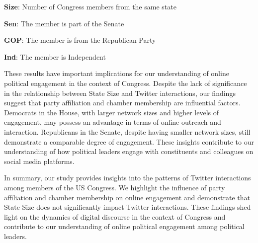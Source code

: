 \documentclass[11pt]{article}
\begin{document}
\begin{table}[h]
\caption{Regression analysis of incoming and outgoing interactions, state size as independent variable, adjusted for Party and Chamber}
\label{table:regression_state_size_interaction}
\begin{threeparttable}
\renewcommand{\TPTminimum}{\linewidth}
\begin{tablenotes}
\footnotesize
\item \textbf{Size}: Number of Congress members from the same state
\item \textbf{Sen}: The member is part of the Senate
\item \textbf{GOP}: The member is from the Republican Party
\item \textbf{Ind}: The member is Independent
\end{tablenotes}
\end{threeparttable}
\end{table}


These results have important implications for our understanding of online political engagement in the context of Congress. Despite the lack of significance in the relationship between State Size and Twitter interactions, our findings suggest that party affiliation and chamber membership are influential factors. Democrats in the House, with larger network sizes and higher levels of engagement, may possess an advantage in terms of online outreach and interaction. Republicans in the Senate, despite having smaller network sizes, still demonstrate a comparable degree of engagement. These insights contribute to our understanding of how political leaders engage with constituents and colleagues on social media platforms.

In summary, our study provides insights into the patterns of Twitter interactions among members of the US Congress. We highlight the influence of party affiliation and chamber membership on online engagement and demonstrate that State Size does not significantly impact Twitter interactions. These findings shed light on the dynamics of digital discourse in the context of Congress and contribute to our understanding of online political engagement among political leaders.
\end{document}
